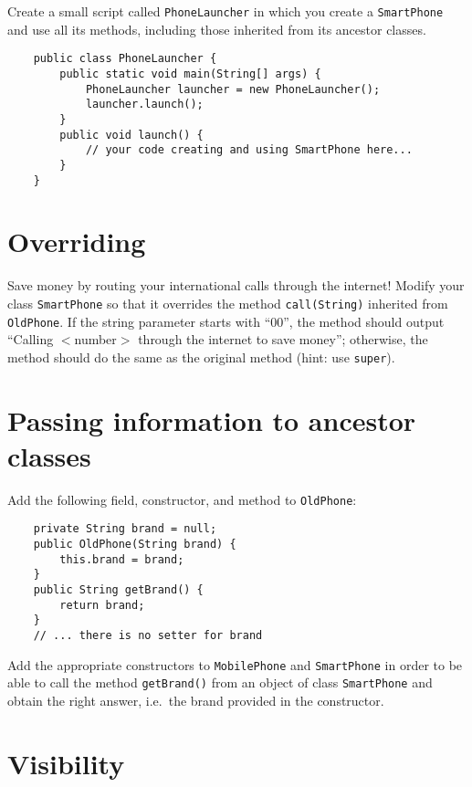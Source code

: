 \documentclass{article}
\begin{document}
Create a small script called \verb+PhoneLauncher+ 
in which you create a \verb+SmartPhone+ and use
all its methods, including those inherited from its ancestor classes. 

\begin{verbatim}
    public class PhoneLauncher {
        public static void main(String[] args) {
            PhoneLauncher launcher = new PhoneLauncher();
            launcher.launch();
        }
        public void launch() {
            // your code creating and using SmartPhone here...
        }
    }
\end{verbatim}

\section{Overriding}
\label{sec:overriding}

Save money by routing your international calls through the internet!
Modify your class \verb+SmartPhone+ so that it overrides the method
\verb+call(String)+ inherited from \verb+OldPhone+. If the string
parameter starts with ``00'', the method should output ``Calling
$<$number$>$ through the internet to save money''; otherwise, the method
should do the same as the original method (hint: use \verb+super+). 

\section{Passing information to ancestor classes}
\label{sec:pass-inform-ancest}

Add the following field, constructor, and method to \verb+OldPhone+: 

\begin{verbatim}
    private String brand = null;
    public OldPhone(String brand) {
        this.brand = brand;
    }
    public String getBrand() {
        return brand;
    }
    // ... there is no setter for brand
\end{verbatim}

Add the appropriate constructors to \verb+MobilePhone+ and
\verb+SmartPhone+ in order to be able to call the method
\verb+getBrand()+ from an object of class \verb+SmartPhone+ and
obtain the right answer, i.e.~the brand provided in the constructor. 

\section{Visibility}
\label{sec:visibility}
\end{document}
